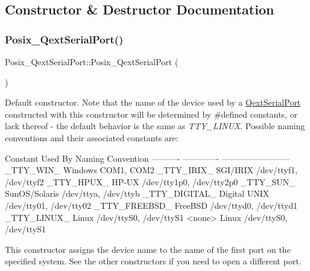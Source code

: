 \subsection{Constructor \& Destructor Documentation}
\mbox{\label{class_posix___qext_serial_port_ae6e0dda91cd654352c26686e88a416ff}} 
\subsubsection{\texorpdfstring{Posix\+\_\+\+Qext\+Serial\+Port()}{Posix\_QextSerialPort()}\hspace{0.1cm}{\footnotesize\ttfamily [1/2]}}
{\footnotesize\ttfamily Posix\+\_\+\+Qext\+Serial\+Port\+::\+Posix\+\_\+\+Qext\+Serial\+Port (\begin{DoxyParamCaption}{ }\end{DoxyParamCaption})}

Default constructor. Note that the name of the device used by a \mbox{\hyperlink{class_qext_serial_port}{Qext\+Serial\+Port}} constructed with this constructor will be determined by \#defined constants, or lack thereof -\/ the default behavior is the same as {\itshape T\+T\+Y\+\_\+\+L\+I\+N\+UX}. Possible naming conventions and their associated constants are\+:

\begin{DoxyVerb}Constant         Used By         Naming Convention
----------       -------------   ------------------------
_TTY_WIN_        Windows         COM1, COM2
_TTY_IRIX_       SGI/IRIX        /dev/ttyf1, /dev/ttyf2
_TTY_HPUX_       HP-UX           /dev/tty1p0, /dev/tty2p0
_TTY_SUN_        SunOS/Solaris   /dev/ttya, /dev/ttyb
_TTY_DIGITAL_    Digital UNIX    /dev/tty01, /dev/tty02
_TTY_FREEBSD_    FreeBSD         /dev/ttyd0, /dev/ttyd1
_TTY_LINUX_      Linux           /dev/ttyS0, /dev/ttyS1
<none>           Linux           /dev/ttyS0, /dev/ttyS1
\end{DoxyVerb}


This constructor assigns the device name to the name of the first port on the specified system. See the other constructors if you need to open a different port. \mbox{\label{class_posix___qext_serial_port_ac409b3d891500be663894c9910749390}} 
